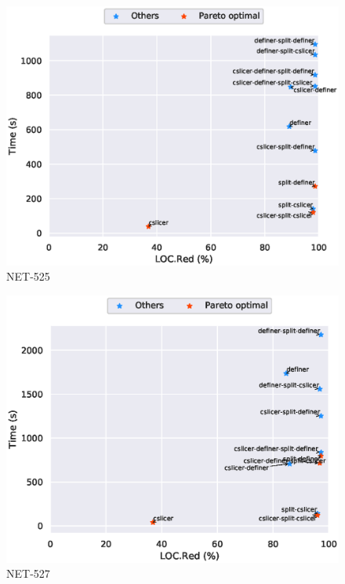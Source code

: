 \begin{figure}
\includegraphics[scale=0.7]{plots/pareto/NET-525-pareto}
\caption{NET-525}
\end{figure}
\begin{figure}
\includegraphics[scale=0.7]{plots/pareto/NET-527-pareto}
\caption{NET-527}
\end{figure}
